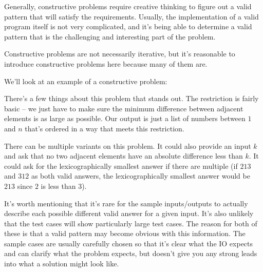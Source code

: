 Generally, constructive problems require creative thinking to figure out a valid pattern that will satisfy the requirements. Usually, the implementation of a valid program itself is not very complicated, and it's being able to determine a valid pattern that is the challenging and interesting part of the problem.

Constructive problems are not necessarily iterative, but it's reasonable to introduce constructive problems here because many of them are.

We'll look at an example of a constructive problem:

\hrulefill



\hrulefill

There's a few things about this problem that stands out. The restriction is fairly basic -- we just have to make sure the minimum difference between adjacent elements is as large as possible. Our output is just a list of numbers between $1$ and $n$ that's ordered in a way that meets this restriction.

There can be multiple variants on this problem. It could also provide an input $k$ and ask that no two adjacent elements have an absolute difference less than $k$. It could ask for the lexicographically smallest answer if there are multiple (if $2 1 3$ and $3 1 2$ as both valid answers, the lexicographically smallest answer would be $2 1 3$ since $2$ is less than $3$).

It's worth mentioning that it's rare for the sample inputs/outputs to actually describe each possible different valid answer for a given input. It's also unlikely that the test cases will show particularly large test cases. The reason for both of these is that a valid pattern may become obvious with this information. The sample cases are usually carefully chosen so that it's clear what the IO expects and can clarify what the problem expects, but doesn't give you any strong leads into what a solution might look like.
